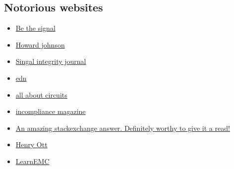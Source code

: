 \documentclass[final]{cubedoc}
\begin{document}
	\subsection{Notorious websites}
	\begin{itemize}
		\item \href{https://bethesignal.com/bogatin/}{Be the signal}
		\item \href{http://www.sigcon.com/}{Howard johnson}
		\item \href{https://www.signalintegrityjournal.com/}{Singal integrity journal}
		\item \href{https://www.edn.com/}{edn}
		\item \href{https://www.allaboutcircuits.com/}{all about circuits}
		\item \href{https://incompliancemag.com/topics/resources/}{incompliance magazine}
		\item \href{https://electronics.stackexchange.com/questions/15135/decoupling-caps-pcb-layout/15143#15143}{An amazing stackexchange answer. Definitely worthy to give it a read!}
		\item \href{http://www.hottconsultants.com/}{Henry Ott}
		\item \href{https://learnemc.com/}{LearnEMC}
	\end{itemize}
	
\end{document}
